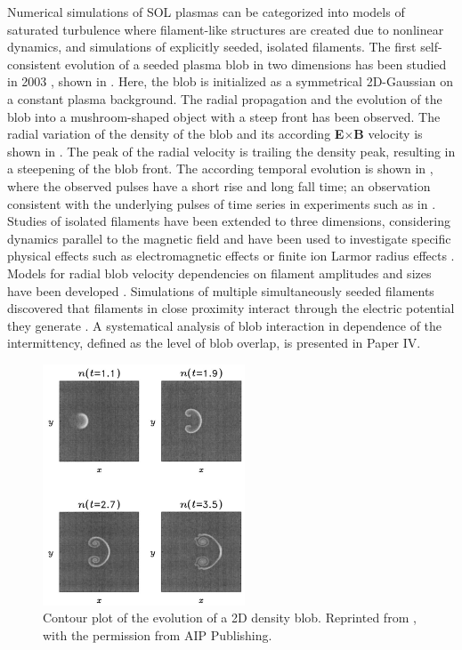 Numerical simulations of SOL plasmas can be categorized into models of saturated turbulence where filament-like structures are created due to nonlinear dynamics, and simulations of explicitly seeded,  isolated filaments. The first self-consistent evolution of a seeded plasma blob in two dimensions has been studied in 2003 \cite{bian2003blobs}, shown in . Here, the blob is initialized as a symmetrical 2D-Gaussian on a constant plasma background. The radial propagation and the evolution of the blob into a mushroom-shaped object with a steep front has been observed.  The radial variation of the density of the blob and its according \textbf{E}$\times$\textbf{B} velocity is shown in . The peak of the radial velocity is trailing the density peak, resulting in a steepening of the blob front. The according temporal evolution is shown in , where the observed pulses have a short rise and long fall time; an observation consistent with the underlying pulses of time series in experiments such as in . Studies of isolated filaments have been extended to three dimensions, considering dynamics parallel to the magnetic field \cite{angus2012effect,walkden2013characterization,easy2014three,easy2016investigation,militello2016multi,riva2016blob} and have been used to investigate specific physical effects such as electromagnetic effects or finite ion Larmor radius effects \cite{angus2012effect,lee2015electromagnetic,gingell2012transport,gingell2014plasma}. Models for radial blob velocity dependencies on filament amplitudes and sizes have been developed \cite{garcia2005mechanism, garcia2006radial,kube2011velocity,kube2016amplitude}. Simulations of multiple simultaneously seeded filaments discovered that filaments in close proximity interact through the electric potential they generate \cite{militello2017interaction,kendl2018gyrofluid}. A systematical analysis of blob interaction in dependence of the intermittency, defined as the level of blob overlap, is presented in Paper IV.
\begin{figure}[t]
	\centering
	\includegraphics[width=6cm]{figures/bian.png}
	\caption{Contour  plot  of  the  evolution  of  a  2D  density  blob. Reprinted from \cite{bian2003blobs}, with the permission from AIP Publishing.}
	\label{Fig:bian}
\end{figure}
